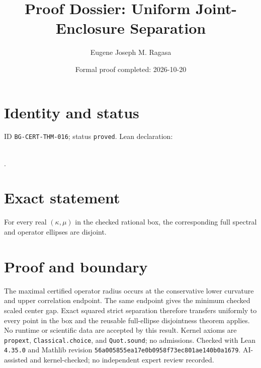 \documentclass[11pt]{article}
\title{Proof Dossier: Uniform Joint-Enclosure Separation}\author{Eugene Joseph M. Ragasa}\date{Formal proof completed: 2026-10-20}
\begin{document}
\maketitle
\section{Identity and status}
ID \texttt{BG-CERT-THM-016}; status \texttt{proved}. Lean declaration:
\par{}\\
{\tiny{}}.
\section{Exact statement}
For every real $(\kappa,\mu)$ in the checked rational box, the corresponding full
spectral and operator ellipses are disjoint.
\section{Proof and boundary}
The maximal certified operator radius occurs at the conservative lower curvature and
upper correlation endpoint. The same endpoint gives the minimum checked scaled center
gap. Exact squared strict separation therefore transfers uniformly to every point in the
box and the reusable full-ellipse disjointness theorem applies. No runtime or scientific
data are accepted by this result. Kernel axioms are \texttt{propext},
\texttt{Classical.choice}, and \texttt{Quot.sound}; no admissions. Checked with Lean
\texttt{4.35.0} and Mathlib revision
\texttt{56a005855ea17e0b0958f73ec801ae140b0a1679}. AI-assisted and kernel-checked;
no independent expert review recorded.
\end{document}
